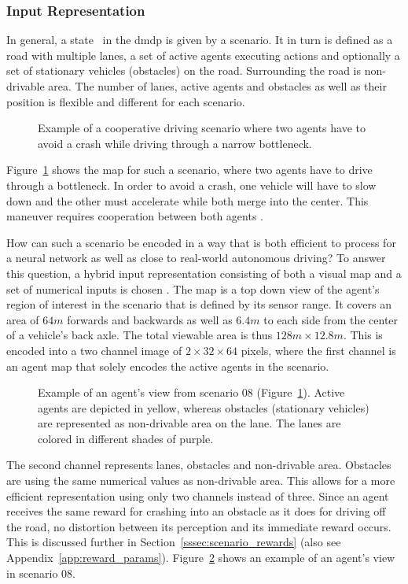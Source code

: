 \subsubsection{Input Representation}\label{sssec:input_representation}
In general, a state \state\ in the \gls{dmdp} is given by a scenario. It in turn is defined as a road with multiple lanes, a set of active agents executing actions and optionally a set of stationary vehicles (obstacles) on the road. Surrounding the road is non-drivable area. The number of lanes, active agents and obstacles as well as their position is flexible and different for each scenario.
\begin{figure}[!h]
\centering

\caption[Scenario example]{Example of a cooperative driving scenario where two agents have to avoid a crash while driving through a narrow bottleneck.}
\label{fig:scenario_example}
\end{figure}
Figure~\ref{fig:scenario_example} shows the map for such a scenario, where two agents have to drive through a bottleneck. In order to avoid a crash, one vehicle will have to slow down and the other must accelerate while both merge into the center. This maneuver requires cooperation between both agents \cite{kurzerDecentralizedCooperativePlanning2018}.

How can such a scenario be encoded in a way that is both efficient to process for a neural network as well as close to real-world autonomous driving? To answer this question, a hybrid input representation consisting of both a visual map and a set of numerical inputs is chosen \cite{bacchianiMicroscopicTrafficSimulation2019, kurzerAcceleratingCooperativePlanning2020}. The map is a top down view of the agent's region of interest in the scenario that is defined by its sensor range. It covers an area of $64m$ forwards and backwards as well as $6.4m$ to each side from the center of a vehicle's back axle. The total viewable area is thus $128m \times 12.8m$. This is encoded into a two channel image of $2 \times 32 \times 64$ pixels, where the first channel is an agent map that solely encodes the active agents in the scenario. 
\begin{figure}[!t]
	\centering
	\captionsetup{justification=centering}
    \scalebox{0.6}{}
	\caption[Agent view example]{Example of an agent's view from scenario 08 (Figure~\ref{fig:scenario_example}). Active agents are depicted in yellow, whereas obstacles (stationary vehicles) are represented as non-drivable area on the lane. The lanes are colored in different shades of purple.}
\label{fig:agent_view}
\end{figure}
The second channel represents lanes, obstacles and non-drivable area. Obstacles are using the same numerical values as non-drivable area. This allows for a more efficient representation using only two channels instead of three. Since an agent receives the same reward for crashing into an obstacle as it does for driving off the road, no distortion between its perception and its immediate reward occurs. This is discussed further in Section~\ref{sssec:scenario_rewards} (also see Appendix~\ref{app:reward_params}). Figure~\ref{fig:agent_view} shows an example of an agent's view in scenario 08.

